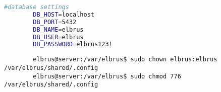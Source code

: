 	\lstset{style=files}
	\begin{lstlisting}[caption={Anhand von '.config.example' eigene '.config' Datei in \newline'/var/elbrus/shared' anlegen.}, language=bash]
		#database settings
		DB_HOST=localhost
		DB_PORT=5432
		DB_NAME=elbrus
		DB_USER=elbrus
		DB_PASSWORD=elbrus123!
	\end{lstlisting}
	
	\lstset{style=commands}
	\begin{lstlisting}
		elbrus@server:/var/elbrus$ sudo chown elbrus:elbrus /var/elbrus/shared/.config
		elbrus@server:/var/elbrus$ sudo chmod 776 /var/elbrus/shared/.config
	\end{lstlisting}